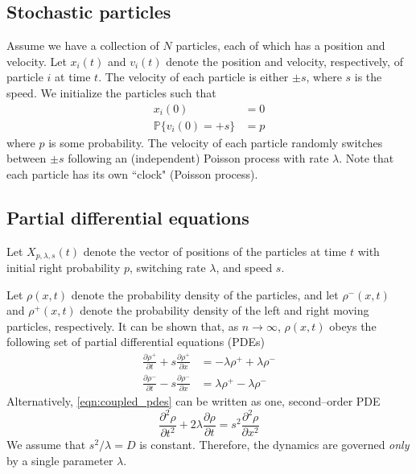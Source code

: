 \documentclass[prl,reprint]{revtex4-1}
\begin{document}
\subsection{Stochastic particles}

Assume we have a collection of $N$ particles, each of which has a position and velocity. 
%
Let $x_i(t)$ and $v_i(t)$ denote the position and velocity, respectively, of particle $i$ at time $t$.
%
The velocity of each particle is either $\pm s$, where $s$ is the speed. 
%
We initialize the particles such that
\begin{equation}
\begin{aligned}
x_i(0) & = 0 \\
\mathbb{P} \{ v_i(0) = +s \} & = p
\end{aligned}
\end{equation}
where $p$ is some probability.
%
The velocity of each particle randomly switches between $\pm s$ following an (independent) Poisson process with rate $\lambda$.
%
Note that each particle has its own ``clock" (Poisson process).

\subsection{Partial differential equations}

Let $X_{p, \lambda, s}(t)$ denote the vector of positions of the particles at time $t$ with initial right probability $p$, switching rate $\lambda$, and speed $s$.

Let $\rho(x, t)$ denote the probability density of the particles, and let $\rho^-(x, t)$ and $\rho^+(x, t)$ denote the probability density of the left and right moving particles, respectively.
%
It can be shown that, as $n \rightarrow \infty$, $\rho(x, t)$ obeys the following set of partial differential equations (PDEs)
\begin{equation} \label{eqn:coupled_pdes}
\begin{aligned}
\frac{\partial \rho^+}{\partial t} + s \frac{\partial \rho^+}{\partial x} & = -\lambda \rho^+ +\lambda \rho^- \\
\frac{\partial \rho^-}{\partial t} - s \frac{\partial \rho^-}{\partial x} & = \lambda \rho^+ -\lambda \rho^- 
\end{aligned}
\end{equation}
%
Alternatively, \eqref{eqn:coupled_pdes} can be written as one, second--order PDE
\begin{equation} \label{eq:second_order_pde}
\frac{\partial^2 \rho}{\partial t^2} + 2 \lambda \frac{\partial \rho}{\partial t} = s^2 \frac{\partial ^2 \rho}{\partial x^2}
\end{equation}
%
We assume that $s^2/\lambda = D$ is constant.
%
Therefore, the dynamics are governed {\em only} by a single parameter $\lambda$.
\end{document}
